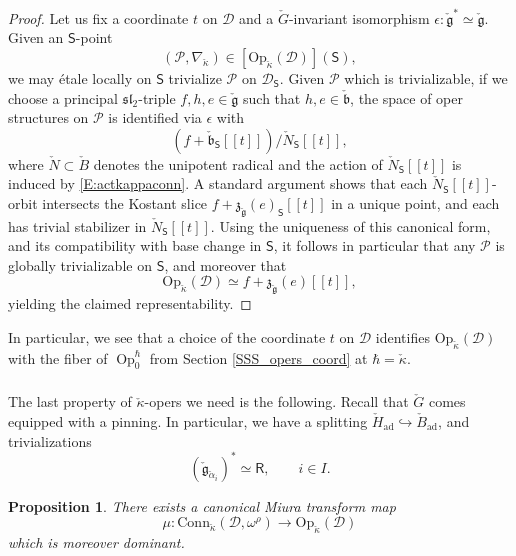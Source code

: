 \documentclass{amsart}
\newtheorem{Prop}[Thm]{Proposition}
\theoremstyle{definition}
\newcommand{\fb}{\mathfrak{b}}
\newcommand{\sss}{\subsubsection{}}
\newcommand{\fg}{\mathfrak{g}}
\newcommand{\D}{\sD}
\newcommand{\sD}{\mathscr{D}}
\newcommand{\Sing}{\mathsf{S}}
\newcommand{\on}{\mathrm}
\newcommand{\Ring}{\mathsf{R}}
\newcommand{\sP}{\mathscr{P}}
\newcommand{\ckappa}{\check{\kappa}}
\newcommand{\Conn}{\on{Conn}}
\newcommand{\Op}{\on{Op}}
\numberwithin{equation}{section}
\begin{document}
\begin{proof} Let us fix a coordinate $t$ on $\sD$ and a $\check{G}$-invariant isomorphism $\epsilon: \check{\fg}^* \simeq \check{\fg}$. Given an $\Sing$-point $$(\sP, \nabla_{\ckappa}) \in [\Op_{\ckappa}(\sD)](\Sing),$$we may \'{e}tale locally on $\Sing$ trivialize $\sP$ on $\sD_\Sing$. Given $\sP$ which is trivializable, if we choose a principal $\mathfrak{sl}_2$-triple $f,h,e \in \check{\fg}$ such that $h,e \in \check{\fb}$, the space of oper structures on $\sP$ is identified via $\epsilon$ with 
$$(f + \check{\mathfrak{b}}_\Sing[[t]]) / \check{N}_\Sing[[t]],$$
where $\check{N} \subset \check{B}$ denotes the unipotent radical and the action of $\check{N}_\Sing[[t]]$ is induced by \eqref{E:actkappaconn}. A standard argument shows that each $\check{N}_\Sing[[t]]$-orbit intersects the Kostant slice $f + \mathfrak{z}_{\check{\fg}}(e)_\Sing[[t]]$ in a unique point, and each has trivial stabilizer in $\check{N}_\Sing[[t]]$. Using the uniqueness of this canonical form, and its compatibility with base change in $\Sing$, it follows in particular that any $\sP$ is globally trivializable on $\Sing$, and moreover that 
$$\on{Op}_{\ckappa}(\sD) \simeq f + \mathfrak{z}_{\check{\fg}}(e)[[t]],$$yielding the claimed representability. 
\end{proof}

{In particular, we see that a choice of the coordinate $t$ on $\D$ identifies $\on{Op}_{\check{\kappa}}(\D)$ with the fiber of $\operatorname{Op}^\hbar_0$ from Section \ref{SSS_opers_coord} at $\hbar=\check{\kappa}$.}


\sss{} The last property of $\ckappa$-opers we need is the following. Recall that $\check{G}$ comes equipped with a pinning. In particular, we have a splitting $\check{H}_{\on{ad}} \hookrightarrow \check{B}_{\on{ad}}$, and trivializations $$(\check{\fg}_{\check{\alpha}_i})^* \simeq \Ring, \quad \quad i \in I.$$

\begin{Prop} There exists a canonical {\em Miura transform} map 
$$\mu: \Conn_{\ckappa}(\sD, \omega^\rho) \rightarrow \Op_{\ckappa}(\sD)$$
which is moreover dominant. \label{p:miuradisc}
\end{Prop} 
\end{document}
